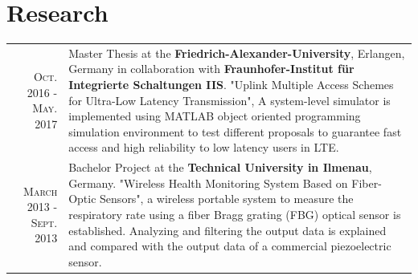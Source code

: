 \documentclass[a4paper,10pt]{article}
\begin{document}
\section{Research}
\begin{tabular}{r|p{9cm}}
\textsc{Oct.} 2016 - \textsc{May.} 2017 & Master Thesis at the {\bf Friedrich-Alexander-University}, Erlangen, Germany in collaboration with {\bf Fraunhofer-Institut für Integrierte Schaltungen IIS}. "Uplink Multiple Access Schemes for Ultra-Low Latency Transmission", A system-level simulator is implemented using MATLAB object oriented programming simulation environment to test different proposals to guarantee fast access and high reliability to low latency users in LTE.\\
 \textsc{March} 2013 - \textsc{Sept.} 2013 & Bachelor Project at the {\bf Technical University in Ilmenau}, Germany. "Wireless Health Monitoring System Based on Fiber-Optic Sensors", a wireless portable system to measure the respiratory rate using a fiber Bragg grating (FBG) optical sensor is established. Analyzing and filtering the output data is explained and compared with the output data of a commercial piezoelectric sensor.\\
\end{tabular}
\end{document}
